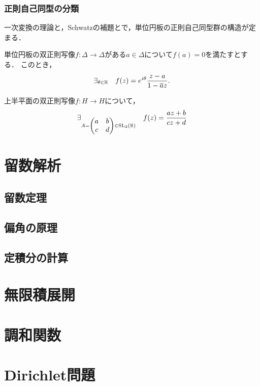 \documentclass[uplatex, dvipdfmx]{jsreport}
\begin{document}
\subsection{正則自己同型の分類}

\begin{tcolorbox}[colframe=ForestGreen, colback=ForestGreen!10!white,breakable,colbacktitle=ForestGreen!40!white,coltitle=black,fonttitle=\bfseries\sffamily,
title=]
    一次変換の理論と，Schwatzの補題とで，単位円板の正則自己同型群の構造が定まる．
\end{tcolorbox}

\begin{theorem}[単位円板の双正則写像は一次変換と回転の合成である]
    単位円板の双正則写像$f:\Delta\to\Delta$がある$a\in\Delta$について$f(a)=0$を満たすとする．
    このとき，
    \[\exists_{\theta\in\mathbb{R}}\quad f(z)=e^{i\theta}\frac{z-a}{1-\overline{a}z}.\]
\end{theorem}

\begin{corollary}[上半平面の双正則写像は特殊線型群が定める一次変換である]
    上半平面の双正則写像$f:H\to H$について，
    \[\exists_{A=\begin{pmatrix}a&b\\c&d\end{pmatrix}\in\mathrm{SL}_2(\mathbb{R})}\quad f(z)=\frac{az+b}{cz+d}\]
\end{corollary}

\chapter{留数解析}

\section{留数定理}

\section{偏角の原理}

\section{定積分の計算}

\chapter{無限積展開}

\chapter{調和関数}

\chapter{Dirichlet問題}
\end{document}
